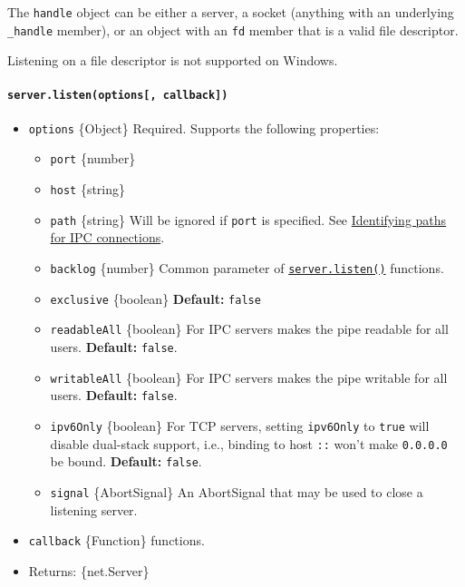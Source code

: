 The \texttt{handle} object can be either a server, a socket (anything
with an underlying \texttt{\_handle} member), or an object with an
\texttt{fd} member that is a valid file descriptor.

Listening on a file descriptor is not supported on Windows.

\paragraph{\texorpdfstring{\texttt{server.listen(options{[},\ callback{]})}}{server.listen(options{[}, callback{]})}}\label{server.listenoptions-callback}

\begin{itemize}
\tightlist
\item
  \texttt{options} \{Object\} Required. Supports the following
  properties:

  \begin{itemize}
  \tightlist
  \item
    \texttt{port} \{number\}
  \item
    \texttt{host} \{string\}
  \item
    \texttt{path} \{string\} Will be ignored if \texttt{port} is
    specified. See
    \hyperref[identifying-paths-for-ipc-connections]{Identifying paths
    for IPC connections}.
  \item
    \texttt{backlog} \{number\} Common parameter of
    \hyperref[serverlisten]{\texttt{server.listen()}} functions.
  \item
    \texttt{exclusive} \{boolean\} \textbf{Default:} \texttt{false}
  \item
    \texttt{readableAll} \{boolean\} For IPC servers makes the pipe
    readable for all users. \textbf{Default:} \texttt{false}.
  \item
    \texttt{writableAll} \{boolean\} For IPC servers makes the pipe
    writable for all users. \textbf{Default:} \texttt{false}.
  \item
    \texttt{ipv6Only} \{boolean\} For TCP servers, setting
    \texttt{ipv6Only} to \texttt{true} will disable dual-stack support,
    i.e., binding to host \texttt{::} won't make \texttt{0.0.0.0} be
    bound. \textbf{Default:} \texttt{false}.
  \item
    \texttt{signal} \{AbortSignal\} An AbortSignal that may be used to
    close a listening server.
  \end{itemize}
\item
  \texttt{callback} \{Function\} functions.
\item
  Returns: \{net.Server\}
\end{itemize}

